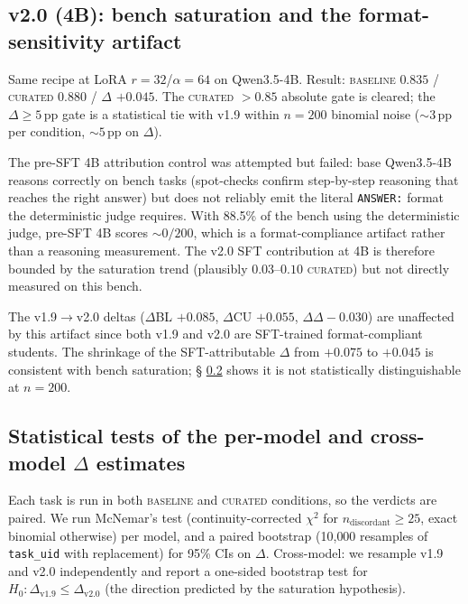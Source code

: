 \documentclass[10pt]{article}
\newcommand{\BL}{\textsc{baseline}\xspace}
\newcommand{\CU}{\textsc{curated}\xspace}
\newcommand{\Qwenf}{Qwen3.5-4B\xspace}
\begin{document}
\subsection{v2.0 (4B): bench saturation and the format-sensitivity artifact}\label{sec:format-sensitivity}
Same recipe at LoRA $r{=}32$/$\alpha{=}64$ on \Qwenf. Result: \BL{} $0.835$ / \CU{} $0.880$ / $\Delta$ $+0.045$. The \CU{} $> 0.85$ absolute gate is cleared; the $\Delta \geq 5$\,pp gate is a statistical tie with v1.9 within $n{=}200$ binomial noise ($\sim 3$\,pp per condition, $\sim 5$\,pp on $\Delta$).

The pre-SFT 4B attribution control was attempted but failed: base \Qwenf{} reasons correctly on bench tasks (spot-checks confirm step-by-step reasoning that reaches the right answer) but does not reliably emit the literal \texttt{ANSWER:} format the deterministic judge requires. With 88.5\% of the bench using the deterministic judge, pre-SFT 4B scores $\sim\!0/200$, which is a format-compliance artifact rather than a reasoning measurement. The v2.0 SFT contribution at 4B is therefore bounded by the saturation trend (plausibly $0.03$--$0.10$ \CU) but not directly measured on this bench.

The v1.9$\to$v2.0 deltas ($\Delta$BL $+0.085$, $\Delta$CU $+0.055$, $\Delta\Delta -0.030$) are unaffected by this artifact since both v1.9 and v2.0 are SFT-trained format-compliant students. The shrinkage of the SFT-attributable $\Delta$ from $+0.075$ to $+0.045$ is consistent with bench saturation; § \ref{sec:stats} shows it is not statistically distinguishable at $n{=}200$.

\subsection{Statistical tests of the per-model and cross-model $\Delta$ estimates}\label{sec:stats}

Each task is run in both \BL{} and \CU{} conditions, so the verdicts are paired. We run McNemar's test (continuity-corrected $\chi^2$ for $n_{\mathrm{discordant}} \geq 25$, exact binomial otherwise) per model, and a paired bootstrap (10{,}000 resamples of \texttt{task\_uid} with replacement) for 95\% CIs on $\Delta$. Cross-model: we resample v1.9 and v2.0 independently and report a one-sided bootstrap test for $H_0\!: \Delta_{\mathrm{v1.9}} \leq \Delta_{\mathrm{v2.0}}$ (the direction predicted by the saturation hypothesis).
\end{document}

